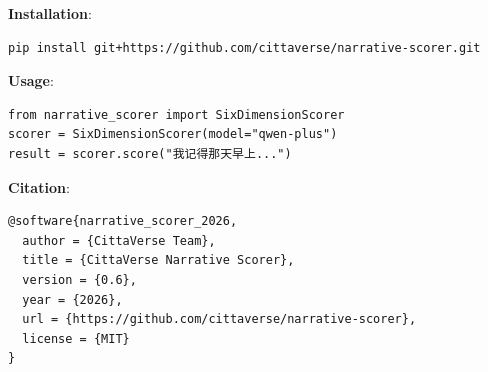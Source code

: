 \documentclass[11pt]{article}
\begin{document}
\textbf{Installation}:
\begin{verbatim}
pip install git+https://github.com/cittaverse/narrative-scorer.git
\end{verbatim}

\textbf{Usage}:
\begin{verbatim}
from narrative_scorer import SixDimensionScorer
scorer = SixDimensionScorer(model="qwen-plus")
result = scorer.score("我记得那天早上...")
\end{verbatim}

\textbf{Citation}:
\begin{verbatim}
@software{narrative_scorer_2026,
  author = {CittaVerse Team},
  title = {CittaVerse Narrative Scorer},
  version = {0.6},
  year = {2026},
  url = {https://github.com/cittaverse/narrative-scorer},
  license = {MIT}
}
\end{verbatim}
\end{document}
